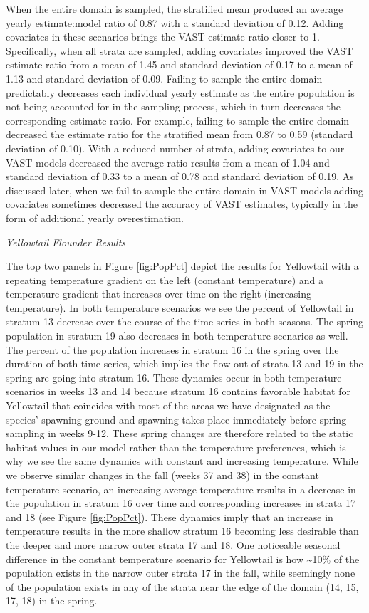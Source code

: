 \documentclass[
  12pt,
]{article}
\begin{document}
When the entire domain is sampled, the stratified mean produced an average yearly estimate:model ratio of 0.87 with a standard deviation of 0.12. Adding covariates in these scenarios brings the VAST estimate ratio closer to 1. Specifically, when all strata are sampled, adding covariates improved the VAST estimate ratio from a mean of 1.45 and standard deviation of 0.17 to a mean of 1.13 and standard deviation of 0.09. Failing to sample the entire domain predictably decreases each individual yearly estimate as the entire population is not being accounted for in the sampling process, which in turn decreases the corresponding estimate ratio. For example, failing to sample the entire domain decreased the estimate ratio for the stratified mean from 0.87 to 0.59 (standard deviation of 0.10). With a reduced number of strata, adding covariates to our VAST models decreased the average ratio results from a mean of 1.04 and standard deviation of 0.33 to a mean of 0.78 and standard deviation of 0.19. As discussed later, when we fail to sample the entire domain in VAST models adding covariates sometimes decreased the accuracy of VAST estimates, typically in the form of additional yearly overestimation.

\emph{Yellowtail Flounder Results}

The top two panels in Figure \ref{fig:PopPct} depict the results for Yellowtail with a repeating temperature gradient on the left (constant temperature) and a temperature gradient that increases over time on the right (increasing temperature). In both temperature scenarios we see the percent of Yellowtail in stratum 13 decrease over the course of the time series in both seasons. The spring population in stratum 19 also decreases in both temperature scenarios as well. The percent of the population increases in stratum 16 in the spring over the duration of both time series, which implies the flow out of strata 13 and 19 in the spring are going into stratum 16. These dynamics occur in both temperature scenarios in weeks 13 and 14 because stratum 16 contains favorable habitat for Yellowtail that coincides with most of the areas we have designated as the species' spawning ground and spawning takes place immediately before spring sampling in weeks 9-12. These spring changes are therefore related to the static habitat values in our model rather than the temperature preferences, which is why we see the same dynamics with constant and increasing temperature. While we observe similar changes in the fall (weeks 37 and 38) in the constant temperature scenario, an increasing average temperature results in a decrease in the population in stratum 16 over time and corresponding increases in strata 17 and 18 (see Figure \ref{fig:PopPct}). These dynamics imply that an increase in temperature results in the more shallow stratum 16 becoming less desirable than the deeper and more narrow outer strata 17 and 18. One noticeable seasonal difference in the constant temperature scenario for Yellowtail is how \textasciitilde10\% of the population exists in the narrow outer strata 17 in the fall, while seemingly none of the population exists in any of the strata near the edge of the domain (14, 15, 17, 18) in the spring.
\end{document}

